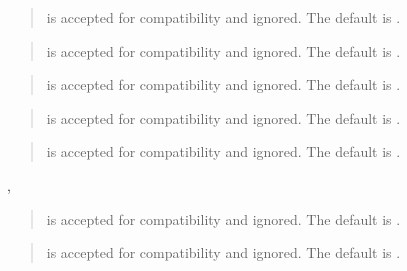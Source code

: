 \documentclass[letterpaper,10pt,english,openany,oneside]{sphinxmanual}
\begin{document}
\begin{quote}

 is accepted for compatibility and ignored. The
default is .
\end{quote}

\begin{quote}

 is accepted for compatibility and ignored. The
default is .
\end{quote}

\begin{quote}

 is accepted for compatibility and ignored.
The default is .
\end{quote}

\begin{quote}

 is accepted for compatibility and ignored. The
default is .
\end{quote}

\begin{quote}

 is accepted for compatibility and ignored. The default
is .
\end{quote}

,
\begin{quote}

 is accepted for compatibility and ignored. The default
is .
\end{quote}

\begin{quote}

 is accepted for compatibility and ignored. The
default is .
\end{quote}
\end{document}
